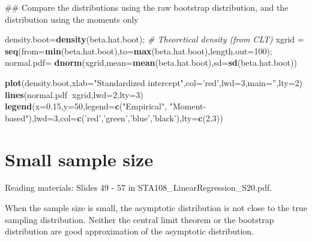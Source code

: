 \documentclass[12pt,]{book}
\newenvironment{Shaded}{\begin{snugshade}}{\end{snugshade}}
\newcommand{\KeywordTok}[1]{\textcolor[rgb]{0.13,0.29,0.53}{\textbf{#1}}}
\newcommand{\DataTypeTok}[1]{\textcolor[rgb]{0.13,0.29,0.53}{#1}}
\newcommand{\DecValTok}[1]{\textcolor[rgb]{0.00,0.00,0.81}{#1}}
\newcommand{\FloatTok}[1]{\textcolor[rgb]{0.00,0.00,0.81}{#1}}
\newcommand{\StringTok}[1]{\textcolor[rgb]{0.31,0.60,0.02}{#1}}
\newcommand{\CommentTok}[1]{\textcolor[rgb]{0.56,0.35,0.01}{\textit{#1}}}
\newcommand{\OperatorTok}[1]{\textcolor[rgb]{0.81,0.36,0.00}{\textbf{#1}}}
\newcommand{\NormalTok}[1]{#1}
\begin{document}
\begin{Shaded}
\begin{Highlighting}[]
\NormalTok{## Compare the distributions using the raw bootstrap distribution, and the distribution using the moments only}


\NormalTok{density.boot=}\KeywordTok{density}\NormalTok{(beta.hat.boot);}
\CommentTok{# Theoretical density (from CLT)}
\NormalTok{xgrid =}\StringTok{ }\KeywordTok{seq}\NormalTok{(}\DataTypeTok{from=}\KeywordTok{min}\NormalTok{(beta.hat.boot),}\DataTypeTok{to=}\KeywordTok{max}\NormalTok{(beta.hat.boot),}\DataTypeTok{length.out=}\DecValTok{100}\NormalTok{);}
\NormalTok{normal.pdf=}\StringTok{ }\KeywordTok{dnorm}\NormalTok{(xgrid,}\DataTypeTok{mean=}\KeywordTok{mean}\NormalTok{(beta.hat.boot),}\DataTypeTok{sd=}\KeywordTok{sd}\NormalTok{(beta.hat.boot))}

\KeywordTok{plot}\NormalTok{(density.boot,}\DataTypeTok{xlab=}\StringTok{"Standardized intercept"}\NormalTok{,}\DataTypeTok{col=}\StringTok{'red'}\NormalTok{,}\DataTypeTok{lwd=}\DecValTok{3}\NormalTok{,}\DataTypeTok{main=}\StringTok{''}\NormalTok{,}\DataTypeTok{lty=}\DecValTok{2}\NormalTok{)}
\KeywordTok{lines}\NormalTok{(normal.pdf}\OperatorTok{~}\NormalTok{xgrid,}\DataTypeTok{lwd=}\DecValTok{2}\NormalTok{,}\DataTypeTok{lty=}\DecValTok{3}\NormalTok{)}
\KeywordTok{legend}\NormalTok{(}\DataTypeTok{x=}\FloatTok{0.15}\NormalTok{,}\DataTypeTok{y=}\DecValTok{50}\NormalTok{,}\DataTypeTok{legend=}\KeywordTok{c}\NormalTok{(}\StringTok{"Empirical"}\NormalTok{, }\StringTok{"Moment-based"}\NormalTok{),}\DataTypeTok{lwd=}\DecValTok{3}\NormalTok{,}\DataTypeTok{col=}\KeywordTok{c}\NormalTok{(}\StringTok{'red'}\NormalTok{,}\StringTok{'green'}\NormalTok{,}\StringTok{'blue'}\NormalTok{,}\StringTok{'black'}\NormalTok{),}\DataTypeTok{lty=}\KeywordTok{c}\NormalTok{(}\DecValTok{2}\NormalTok{,}\DecValTok{3}\NormalTok{))}
\end{Highlighting}
\end{Shaded}

\section{Small sample size}\label{small-sample-size}

Reading materials: Slides 49 - 57 in STA108\_LinearRegression\_S20.pdf.

When the sample size is small, the asymptotic distribution is not close
to the true sampling distribution. Neither the central limit theorem or
the bootstrap distribution are good approximation of the asymptotic
distribution.
\end{document}
